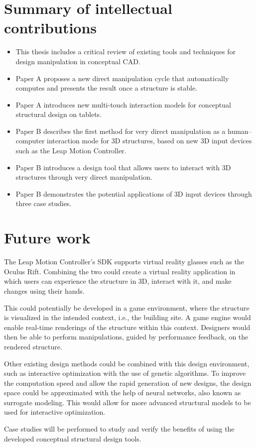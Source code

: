 \section{Summary of intellectual contributions}
\begin{itemize} 
\item This thesis includes a critical review of existing tools and techniques for design manipulation in conceptual CAD.
\item Paper A proposes a new direct manipulation cycle that automatically computes and presents the result once a structure is stable.
\item Paper A introduces new multi-touch interaction models for conceptual structural design on tablets.
\item Paper B describes the first method for very direct manipulation as a human--computer interaction mode for 3D structures, based on new 3D input devices such as the Leap Motion Controller.
\item Paper B introduces a design tool that allows users to interact with 3D structures through very direct manipulation.
\item Paper B demonstrates the potential applications of 3D input devices through three case studies.
\end{itemize} 


\section{Future work}
The Leap Motion Controller’s SDK supports virtual reality glasses such as the Oculus Rift. Combining the two could create a virtual reality application in which users can experience the structure in 3D, interact with it, and make changes using their hands. 

This could potentially be developed in a game environment, where the structure is visualized in the intended context, i.e., the building site. A game engine would enable real-time renderings of the structure within this context. Designers would then be able to perform manipulations, guided by performance feedback, on the rendered structure. 

Other existing design methods could be combined with this design environment, such as interactive optimization with the use of genetic algorithms. To improve the computation speed and allow the rapid generation of new designs, the design space could be approximated with the help of neural networks, also known as surrogate modeling. This would allow for more advanced structural models to be used for interactive optimization.

Case studies will be performed to study and verify the benefits of using the developed conceptual structural design tools.

